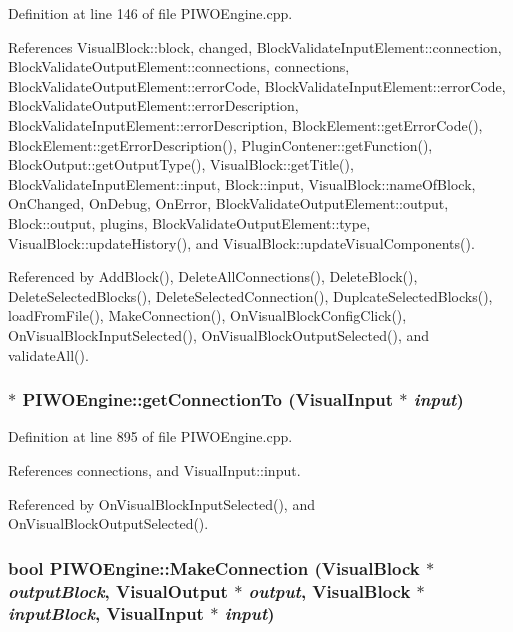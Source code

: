 Definition at line 146 of file PIWOEngine.cpp.

References VisualBlock::block, changed, BlockValidateInputElement::connection, BlockValidateOutputElement::connections, connections, BlockValidateOutputElement::errorCode, BlockValidateInputElement::errorCode, BlockValidateOutputElement::errorDescription, BlockValidateInputElement::errorDescription, BlockElement::getErrorCode(), BlockElement::getErrorDescription(), PluginContener::getFunction(), BlockOutput::getOutputType(), VisualBlock::getTitle(), BlockValidateInputElement::input, Block::input, VisualBlock::nameOfBlock, OnChanged, OnDebug, OnError, BlockValidateOutputElement::output, Block::output, plugins, BlockValidateOutputElement::type, VisualBlock::updateHistory(), and VisualBlock::updateVisualComponents().

Referenced by AddBlock(), DeleteAllConnections(), DeleteBlock(), DeleteSelectedBlocks(), DeleteSelectedConnection(), DuplcateSelectedBlocks(), loadFromFile(), MakeConnection(), OnVisualBlockConfigClick(), OnVisualBlockInputSelected(), OnVisualBlockOutputSelected(), and validateAll().\hypertarget{classPIWOEngine_7d7bed1c6a1f91bd7c3c4ca7ac696bc9}{
\subsubsection[getConnectionTo]{ $\ast$ PIWOEngine::getConnectionTo ({\bf VisualInput} $\ast$ {\em input})}}
\label{classPIWOEngine_7d7bed1c6a1f91bd7c3c4ca7ac696bc9}




Definition at line 895 of file PIWOEngine.cpp.

References connections, and VisualInput::input.

Referenced by OnVisualBlockInputSelected(), and OnVisualBlockOutputSelected().\hypertarget{classPIWOEngine_e993fd1568a25f8ce5e3719212871ae5}{
\subsubsection[MakeConnection]{\setlength{\rightskip}{0pt plus 5cm}bool PIWOEngine::MakeConnection ({\bf VisualBlock} $\ast$ {\em outputBlock}, \/  {\bf VisualOutput} $\ast$ {\em output}, \/  {\bf VisualBlock} $\ast$ {\em inputBlock}, \/  {\bf VisualInput} $\ast$ {\em input})}}
\label{classPIWOEngine_e993fd1568a25f8ce5e3719212871ae5}




